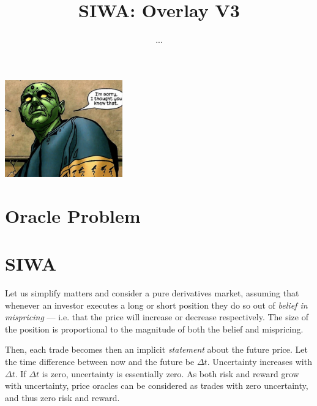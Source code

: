 \documentclass[11pt]{article}
\begin{document}
\pagestyle{plain}
\author{...}
\title{SIWA: Overlay V3
}
 \maketitle
 \abstract{}
 \begin{center}
	 \includegraphics[width=2in]{marvel.png}
 \end{center}
 \section{Oracle Problem}






 \section{SIWA}
 Let us simplify matters and consider a pure derivatives market, assuming that whenever an investor executes a long or short position they do so out of {\it belief in mispricing} --- i.e. that the price will increase or decrease respectively. The size of the position is proportional to the magnitude of both the  belief and  mispricing. %

 Then, each trade becomes then an implicit {\it statement} about the future price. Let the time difference between now and the future be $\Delta t$.
 Uncertainty increases with $\Delta t$. If $\Delta t$ is zero, uncertainty is essentially zero. 
 As both risk and reward grow with uncertainty, %
price oracles can  be considered as trades with zero uncertainty, and thus zero risk and reward. 
\end{document}
